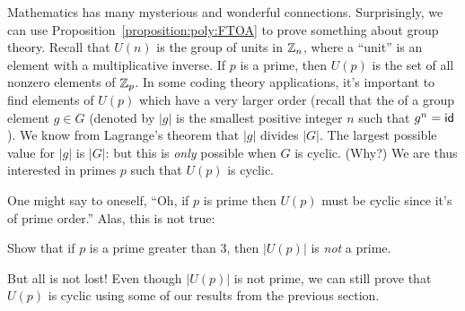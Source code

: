 Mathematics has many mysterious and wonderful connections. Surprisingly, we can use Proposition~\ref{proposition:poly:FTOA} to prove something about group theory.  
Recall that $U(n)$ is the group of units in $\mathbb{Z}_n$, where a ``unit'' is an element with a multiplicative inverse. If $p$ is a prime, then $U(p)$ is the set of all nonzero elements of $\mathbb{Z}_p$. In some coding theory applications, it's important to find elements of $U(p)$ which have a very larger order (recall that the  of a group element $g \in G$ (denoted by $|g|$ is the smallest positive integer $n$ such that $g^n = {\sf{i}d}$). We know from Lagrange's theorem that $|g|$ divides $|G|$.  The largest possible value for $|g|$ is $|G|$: but this is \emph{only} possible when $G$ is cyclic. (Why?)  We are thus interested in primes $p$ such that $U(p)$ is cyclic. 

One might say to oneself, ``Oh, if $p$ is prime then $U(p)$ must be cyclic since it's of prime order.'' Alas, this is not true:

\begin{exercise}{}
Show that if $p$ is a prime greater than 3, then $|U(p)|$ is \emph{not} a prime.
\end{exercise}

But all is not lost! Even though  $|U(p)|$ is not prime, we can still prove that $U(p)$ is cyclic using some of our results from the previous section. 

